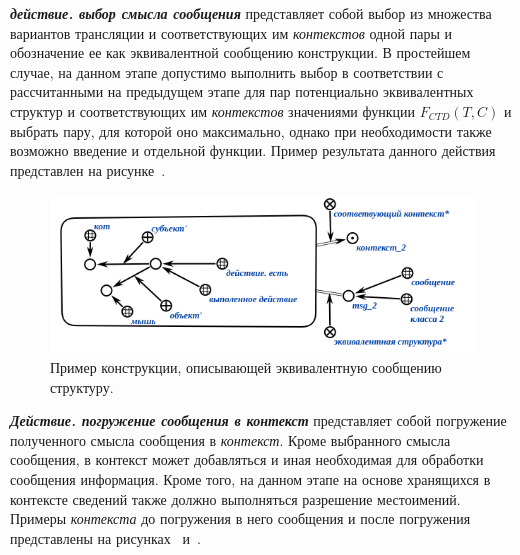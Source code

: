 \textbf{\textit{действие. выбор смысла сообщения}} представляет собой выбор из множества вариантов трансляции и соответствующих им \textit{контекстов} одной пары и обозначение ее как эквивалентной сообщению конструкции.
В простейшем случае, на данном этапе допустимо выполнить выбор в соответствии с рассчитанными на предыдущем этапе для пар потенциально эквивалентных структур и соответствующих им \textit{контекстов} значениями функции \textit{$F_{CTD}(T, C)$} и выбрать пару, для которой оно максимально, однако при необходимости также возможно введение и отдельной функции.
Пример результата данного действия представлен на рисунке~\textit{}.

\begin{figure}[h]
    \centering
    \includegraphics[scale=0.8]{images/part4/chapter_nl_interfaces/message_equivalent_structure}
    \caption{Пример конструкции, описывающей эквивалентную сообщению структуру.}
    \label{fig:message_equivalent_structure}
\end{figure}

\textbf{\textit{Действие. погружение сообщения в контекст}} представляет собой погружение полученного смысла сообщения в \textit{контекст}.
Кроме выбранного смысла сообщения, в контекст может добавляться и иная необходимая для обработки сообщения информация.
Кроме того, на данном этапе на основе хранящихся в контексте сведений также должно выполняться разрешение местоимений.
Примеры \textit{контекста} до погружения в него сообщения и после погружения представлены на рисунках~\textit{} и~\textit{}.

